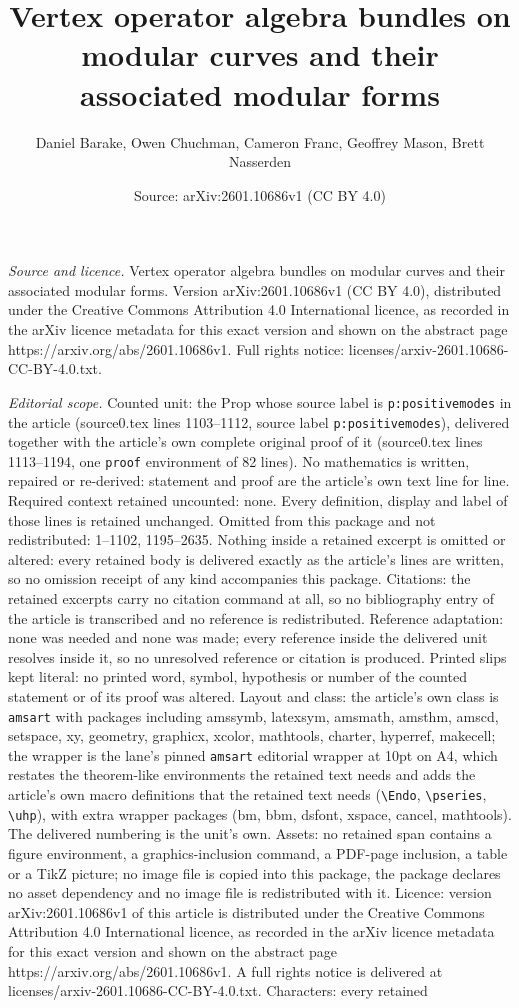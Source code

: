 \documentclass[10pt,a4paper]{amsart}
\title[Vertex operator algebra bundles on modular curves and their ]{Vertex operator algebra bundles on modular curves and their associated modular forms}
\author{Daniel Barake, Owen Chuchman, Cameron Franc, Geoffrey Mason, Brett Nasserden}
\date{Source: arXiv:2601.10686v1 (CC BY 4.0)}
\begin{document}
\maketitle

\noindent\emph{Source and licence.} Vertex operator algebra bundles on modular curves and their associated modular forms. Version arXiv:2601.10686v1 (CC BY 4.0), distributed under the Creative Commons Attribution 4.0 International licence, as recorded in the arXiv licence metadata for this exact version and shown on the abstract page https://arxiv.org/abs/2601.10686v1. Full rights notice: licenses/arxiv-2601.10686-CC-BY-4.0.txt.\par\smallskip

\noindent\textit{Editorial scope.} Counted unit: the Prop whose source label is \texttt{p:positivemodes} in the article (source0.tex lines 1103--1112, source label \texttt{p:positivemodes}), delivered together with the article's own complete original proof of it (source0.tex lines 1113--1194, one \texttt{proof} environment of 82 lines). No mathematics is written, repaired or re-derived: statement and proof are the article's own text line for line. Required context retained uncounted: none. Every definition, display and label of those lines is retained unchanged. Omitted from this package and not redistributed: 1--1102, 1195--2635. Nothing inside a retained excerpt is omitted or altered: every retained body is delivered exactly as the article's lines are written, so no omission receipt of any kind accompanies this package. Citations: the retained excerpts carry no citation command at all, so no bibliography entry of the article is transcribed and no reference is redistributed. Reference adaptation: none was needed and none was made; every reference inside the delivered unit resolves inside it, so no unresolved reference or citation is produced. Printed slips kept literal: no printed word, symbol, hypothesis or number of the counted statement or of its proof was altered. Layout and class: the article's own class is \texttt{amsart} with packages including amssymb, latexsym, amsmath, amsthm, amscd, setspace, xy, geometry, graphicx, xcolor, mathtools, charter, hyperref, makecell; the wrapper is the lane's pinned \texttt{amsart} editorial wrapper at 10pt on A4, which restates the theorem-like environments the retained text needs and adds the article's own macro definitions that the retained text needs (\texttt{\textbackslash Endo}, \texttt{\textbackslash pseries}, \texttt{\textbackslash uhp}), with extra wrapper packages (bm, bbm, dsfont, xspace, cancel, mathtools). The delivered numbering is the unit's own. Assets: no retained span contains a figure environment, a graphics-inclusion command, a PDF-page inclusion, a table or a TikZ picture; no image file is copied into this package, the package declares no asset dependency and no image file is redistributed with it. Licence: version arXiv:2601.10686v1 of this article is distributed under the Creative Commons Attribution 4.0 International licence, as recorded in the arXiv licence metadata for this exact version and shown on the abstract page https://arxiv.org/abs/2601.10686v1. A full rights notice is delivered at licenses/arxiv-2601.10686-CC-BY-4.0.txt. Characters: every retained 
\end{document}
